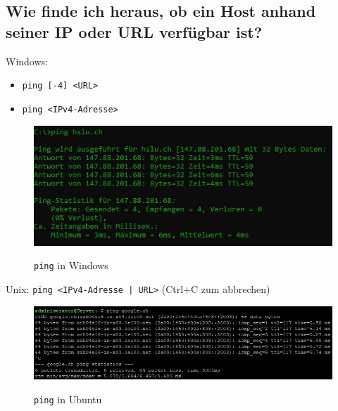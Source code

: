 \subsection*{Wie finde ich heraus, ob ein Host anhand seiner IP oder URL verfügbar ist?}
\begin{multicols}{2}
    Windows:
    \begin{itemize}
        \item \texttt{ping [-4] <URL>}
        \item \texttt{ping <IPv4-Adresse>}
    \end{itemize}
    \begin{figure}[H]
        \begin{center}
        \label{pic:ping_win}
        \includegraphics[width=.5\textwidth]{images/ping_win.jpg}
        \caption{\texttt{ping} in Windows}
        \end{center}
    \end{figure}
    \columnbreak
    Unix: \texttt{ping <IPv4-Adresse | URL>} (Ctrl+C zum abbrechen)
    \vfill\null
    \begin{figure}[H]
        \begin{center}
        \label{pic:ping_unix}
        \includegraphics[width=.5\textwidth]{images/ping_unix.jpg}
        \caption{\texttt{ping} in Ubuntu}
        \end{center}
    \end{figure}
\end{multicols}

